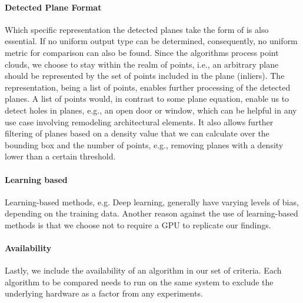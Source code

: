 \documentclass[main.tex]{subfiles}
\begin{document}
\paragraph{Detected Plane Format} \label{subsec:planeformat}
Which specific representation the detected planes take the form of is also essential.
If no uniform output type can be determined, consequently, no uniform metric for comparison can also be found.
Since the algorithms process point clouds, we choose to stay within the realm of points, i.e., an arbitrary plane should be
represented by the set of points included in the plane (inliers).
The representation, being a list of points, enables further processing of the detected planes.
A list of points would, in contrast to some plane equation, enable us to detect holes in planes, e.g.,
an open door or window, which can be helpful in any use case involving remodeling architectural elements.
It also allows further filtering of planes based on a density value that we can calculate over the bounding
box and the number of points, e.g., removing planes with a density lower than a certain threshold.


\paragraph{Learning based}\label{subsec_learning_based}
Learning-based methods, e.g. Deep learning, generally have varying levels of bias, depending on the training data.
Another reason against the use of learning-based methods is that we choose not to require a GPU to replicate our findings.

\paragraph{Availability}
Lastly, we include the availability of an algorithm in our set of criteria.
Each algorithm to be compared needs to run on the same system to exclude the underlying hardware as a factor from any experiments.\\
\end{document}
